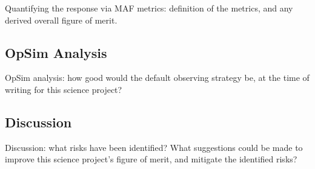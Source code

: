 Quantifying the response via MAF metrics: definition of the metrics,
and any derived overall figure of merit.



\subsection{OpSim Analysis}
\label{sec:keyword:analysis}

OpSim analysis: how good would the default observing strategy be, at
the time of writing for this science project?



\subsection{Discussion}
\label{sec:keyword:discussion}

Discussion: what risks have been identified? What suggestions could be
made to improve this science project's figure of merit, and mitigate
the identified risks?



\navigationbar
